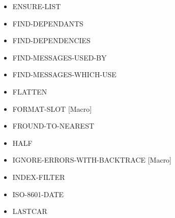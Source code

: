 \documentclass [11pt]{book}
\begin{document}
\begin{itemize}
\item {}ENSURE-LIST





\item {}FIND-DEPENDANTS





\item {}FIND-DEPENDENCIES





\item {}FIND-MESSAGES-USED-BY





\item {}FIND-MESSAGES-WHICH-USE





\item {}FLATTEN





\item {}FORMAT-SLOT [Macro]





\item {}FROUND-TO-NEAREST





\item {}HALF





\item {}IGNORE-ERRORS-WITH-BACKTRACE [Macro]





\item {}INDEX-FILTER





\item {}ISO-8601-DATE





\item {}LASTCAR






\end{itemize}
\end{document}
